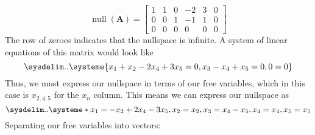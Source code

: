 \documentclass[]{article}
\numberwithin{equation}{section}
\begin{document}
\begin{equation}
	\operatorname{null}(\mathbf{A}) = 
	\left[
	\begin{array}{ccccc|c}
	1 & 1 & 0 & -2 & 3  & 0 \\
	0 & 0 & 1 & -1 & 1 & 0 \\
	0 & 0 & 0 & 0 & 0 & 0
	\end{array}
	\right]
\end{equation}
The row of zeroes indicates that the nullspace is infinite. A system of linear equations of this matrix would look like
\begin{equation}
	\sysdelim..\systeme{x_1 + x_2 - 2x_4 + 3x_5 = 0, x_3 - x_4 + x_5 = 0, 0 = 0}
\end{equation}
Thus, we must express our nullspace in terms of our free variables, which in this case is \(x_{2,4,5}\) for the \(x_n\) column. This means we can express our nullspace as 
\begin{equation}
	\sysdelim..\systeme*{x_1 = -x_2 + 2x_4 - 3x_5, x_2 = x_2, x_3 = x_4 - x_5, x_4 = x_4, x_5 = x_5}
\end{equation}
Separating our free variables into vectors: 
\end{document}
